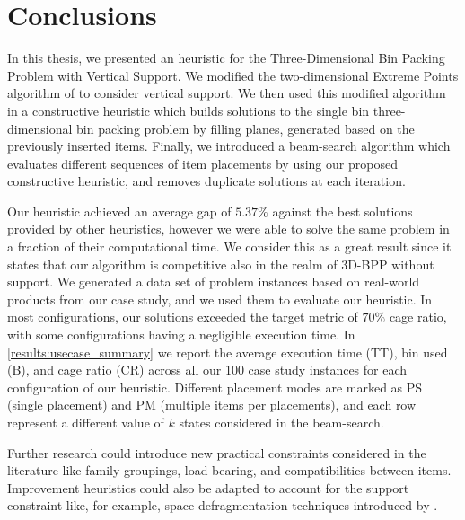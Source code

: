 \documentclass[11pt,a4paper,twocolumn]{article}
\begin{document}
\section{Conclusions}
In this thesis, we presented an heuristic for the Three-Dimensional Bin Packing Problem with Vertical Support.
We modified the two-dimensional Extreme Points algorithm of \citet{crainic2008extreme} to consider vertical support.
We then used this modified algorithm in a constructive heuristic which builds solutions to the single bin three-dimensional bin packing problem by filling planes, generated based on the previously inserted items.
Finally, we introduced a beam-search algorithm which evaluates different sequences of item placements by using our proposed constructive heuristic, and removes duplicate solutions at each iteration.

Our heuristic achieved an average gap of $5.37\%$ against the best solutions provided by other heuristics, however we were able to solve the same problem in a fraction of their computational time.
We consider this as a great result since it states that our algorithm is competitive also in the realm of 3D-BPP without support.
We generated a data set of problem instances based on real-world products from our case study, and we used them to evaluate our heuristic.
In most configurations, our solutions exceeded the target metric of $70\%$ cage ratio, with some configurations having a negligible execution time.
In \cref{results:usecase_summary} we report the average execution time (TT), bin used (B), and cage ratio (CR) across all our 100 case study instances for each configuration of our heuristic. 
Different placement modes are marked as PS (single placement) and PM (multiple items per placements), and each row represent a different value of $k$ states considered in the beam-search.

Further research could introduce new practical constraints considered in the literature like family groupings, load-bearing, and compatibilities between items.
Improvement heuristics could also be adapted to account for the support constraint like, for example, space defragmentation techniques introduced by \cite{ZHU2012452}.



\end{document}
